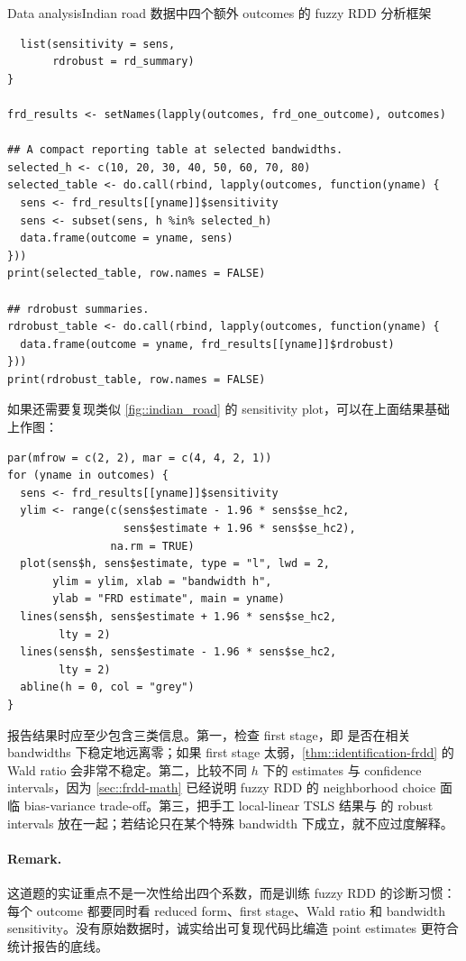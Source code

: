 \begin{exercisesolution}{Data analysis}{Indian road 数据中四个额外 outcomes 的 fuzzy RDD 分析框架}
\begin{lstlisting}
  list(sensitivity = sens,
       rdrobust = rd_summary)
}

frd_results <- setNames(lapply(outcomes, frd_one_outcome), outcomes)

## A compact reporting table at selected bandwidths.
selected_h <- c(10, 20, 30, 40, 50, 60, 70, 80)
selected_table <- do.call(rbind, lapply(outcomes, function(yname) {
  sens <- frd_results[[yname]]$sensitivity
  sens <- subset(sens, h %in% selected_h)
  data.frame(outcome = yname, sens)
}))
print(selected_table, row.names = FALSE)

## rdrobust summaries.
rdrobust_table <- do.call(rbind, lapply(outcomes, function(yname) {
  data.frame(outcome = yname, frd_results[[yname]]$rdrobust)
}))
print(rdrobust_table, row.names = FALSE)
\end{lstlisting}

如果还需要复现类似 \cref{fig::indian_road} 的 sensitivity plot，可以在上面结果基础上作图：
\begin{lstlisting}
par(mfrow = c(2, 2), mar = c(4, 4, 2, 1))
for (yname in outcomes) {
  sens <- frd_results[[yname]]$sensitivity
  ylim <- range(c(sens$estimate - 1.96 * sens$se_hc2,
                  sens$estimate + 1.96 * sens$se_hc2),
                na.rm = TRUE)
  plot(sens$h, sens$estimate, type = "l", lwd = 2,
       ylim = ylim, xlab = "bandwidth h",
       ylab = "FRD estimate", main = yname)
  lines(sens$h, sens$estimate + 1.96 * sens$se_hc2,
        lty = 2)
  lines(sens$h, sens$estimate - 1.96 * sens$se_hc2,
        lty = 2)
  abline(h = 0, col = "grey")
}
\end{lstlisting}

报告结果时应至少包含三类信息。第一，检查 first stage，即  是否在相关 bandwidths 下稳定地远离零；如果 first stage 太弱，\cref{thm::identification-frdd} 的 Wald ratio 会非常不稳定。第二，比较不同 $h$ 下的 estimates 与 confidence intervals，因为 \cref{sec::frdd-math} 已经说明 fuzzy RDD 的 neighborhood choice 面临 bias-variance trade-off。第三，把手工 local-linear TSLS 结果与  的 robust intervals 放在一起；若结论只在某个特殊 bandwidth 下成立，就不应过度解释。

\paragraph{Remark.}
这道题的实证重点不是一次性给出四个系数，而是训练 fuzzy RDD 的诊断习惯：每个 outcome 都要同时看 reduced form、first stage、Wald ratio 和 bandwidth sensitivity。没有原始数据时，诚实给出可复现代码比编造 point estimates 更符合统计报告的底线。
\end{exercisesolution}

